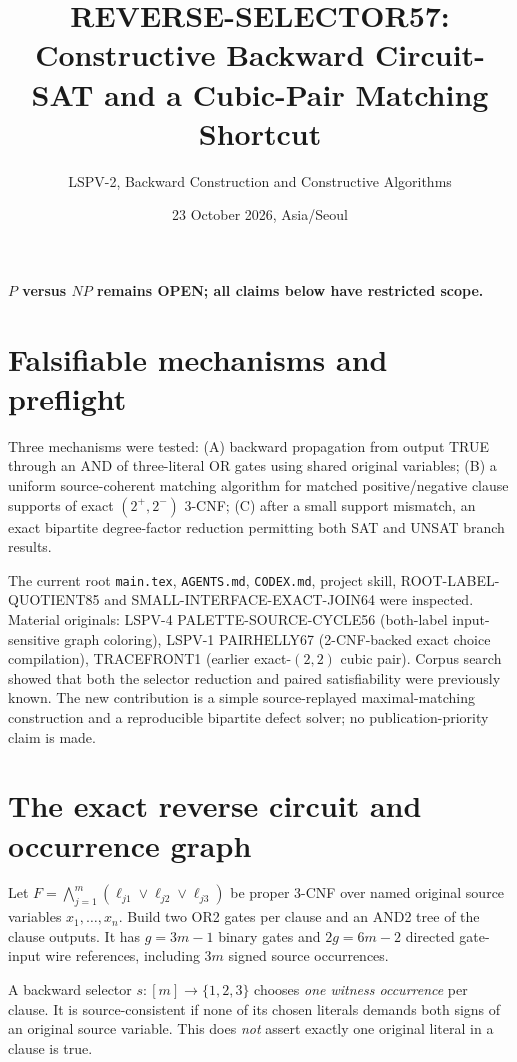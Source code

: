 \documentclass[10pt]{article}
\title{REVERSE-SELECTOR57: Constructive Backward Circuit-SAT and a Cubic-Pair Matching Shortcut}
\author{LSPV-2, Backward Construction and Constructive Algorithms}
\date{23 October 2026, Asia/Seoul}
\begin{document}
\maketitle
\begin{center}\textbf{$P$ versus $NP$ remains OPEN; all claims below have restricted scope.}\end{center}

\section{Falsifiable mechanisms and preflight}
Three mechanisms were tested: (A) backward propagation from output TRUE through an AND of three-literal OR gates using shared original variables; (B) a uniform source-coherent matching algorithm for matched positive/negative clause supports of exact $(2^+,2^-)$ 3-CNF; (C) after a small support mismatch, an exact bipartite degree-factor reduction permitting both SAT and UNSAT branch results.

The current root \texttt{main.tex}, \texttt{AGENTS.md}, \texttt{CODEX.md}, project skill, ROOT-LABEL-QUOTIENT85 and SMALL-INTERFACE-EXACT-JOIN64 were inspected. Material originals: LSPV-4 PALETTE-SOURCE-CYCLE56 (both-label input-sensitive graph coloring), LSPV-1 PAIRHELLY67 (2-CNF-backed exact choice compilation), TRACEFRONT1 (earlier exact-$(2,2)$ cubic pair). Corpus search showed that both the selector reduction and paired satisfiability were previously known. The new contribution is a simple source-replayed maximal-matching construction and a reproducible bipartite defect solver; no publication-priority claim is made.

\section{The exact reverse circuit and occurrence graph}
Let $F=\bigwedge_{j=1}^m(\ell_{j1}\vee\ell_{j2}\vee\ell_{j3})$ be proper 3-CNF over named original source variables $x_1,\ldots,x_n$. Build two OR2 gates per clause and an AND2 tree of the clause outputs. It has $g=3m-1$ binary gates and $2g=6m-2$ directed gate-input wire references, including $3m$ signed source occurrences.

A backward selector $s:[m]\to\{1,2,3\}$ chooses \emph{one witness occurrence} per clause. It is source-consistent if none of its chosen literals demands both signs of an original source variable. This does \emph{not} assert exactly one original literal in a clause is true.
\end{document}
